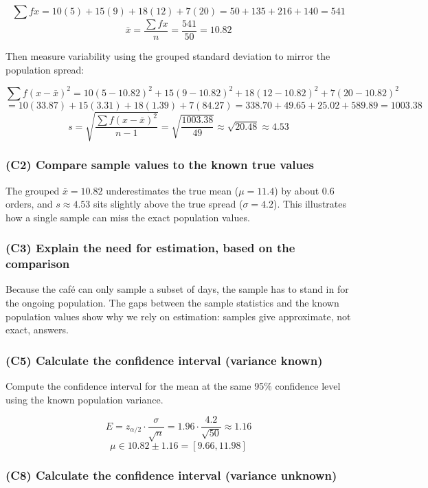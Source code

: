 \[
\sum f x = 10(5) + 15(9) + 18(12) + 7(20) = 50 + 135 + 216 + 140 = 541
\]
\[
\bar{x} = \frac{\sum f x}{n} = \frac{541}{50} = 10.82
\]

Then measure variability using the grouped standard deviation to mirror the population spread:

\[
\sum f(x - \bar{x})^2 = 10(5 - 10.82)^2 + 15(9 - 10.82)^2 + 18(12 - 10.82)^2 + 7(20 - 10.82)^2
\]
\[
= 10(33.87) + 15(3.31) + 18(1.39) + 7(84.27) = 338.70 + 49.65 + 25.02 + 589.89 = 1003.38
\]
\[
 s = \sqrt{\frac{\sum f(x - \bar{x})^2}{n - 1}} = \sqrt{\frac{1003.38}{49}} \approx \sqrt{20.48} \approx 4.53
\]

\subsubsection{(C2) Compare sample values to the known true values}\label{subsubsec:interval-example1-2-c2}

The grouped \(\bar{x} = 10.82\) underestimates the true mean (\(\mu = 11.4\)) by about 0.6 orders, and \(s \approx 4.53\) sits slightly above the true spread (\(\sigma = 4.2\)). This illustrates how a single sample can miss the exact population values.

\subsubsection{(C3) Explain the need for estimation, based on the comparison}\label{subsubsec:interval-example1-2-c3}

Because the café can only sample a subset of days, the sample has to stand in for the ongoing population. The gaps between the sample statistics and the known population values show why we rely on estimation: samples give approximate, not exact, answers.

\subsubsection{(C5) Calculate the confidence interval (variance known)}\label{subsubsec:interval-example1-2-c5}

Compute the confidence interval for the mean at the same 95\% confidence level using the known population variance.

\[
E = z_{\alpha/2} \cdot \frac{\sigma}{\sqrt{n}} = 1.96 \cdot \frac{4.2}{\sqrt{50}} \approx 1.16
\]
\[
\mu \in 10.82 \pm 1.16 = [9.66, 11.98]
\]

\subsubsection{(C8) Calculate the confidence interval (variance unknown)}\label{subsubsec:interval-example1-2-c8}

